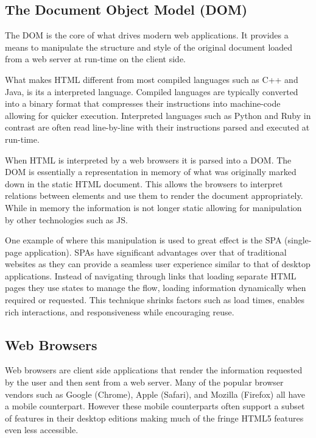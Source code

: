 \documentclass[final]{cmpreport}
\begin{document}

\subsection{The Document Object Model (DOM)}
The DOM is the core of what drives modern web applications. It provides a means to manipulate the structure and style of the original document loaded from a web server at run-time on the client side.

What makes HTML different from most compiled languages such as C++ and Java, is its a interpreted language. Compiled languages are typically converted into a binary format that compresses their instructions into machine-code allowing for quicker execution. Interpreted languages such as Python and Ruby in contrast are often read line-by-line with their instructions parsed and executed at run-time.

When HTML is interpreted by a web browsers it is parsed into a DOM. The DOM is essentially a representation in memory of what was originally marked down in the static HTML document. This allows the browsers to interpret relations between elements and use them to render the document appropriately. While in memory the information is not longer static allowing for manipulation by other technologies such as JS.

One example of where this manipulation is used to great effect is the SPA (single-page application). SPAs have significant advantages over that of traditional websites as they can provide a seamless user experience similar to that of desktop applications. Instead of navigating through links that loading separate HTML pages they use states to manage the flow, loading information dynamically when required or requested. This technique shrinks factors such as load times, enables rich interactions, and responsiveness while encouraging reuse. \citep{Takada}

\subsection{Web Browsers}
Web browsers are client side applications that render the information requested by the user and then sent from a web server. Many of the popular browser vendors such as Google (Chrome), Apple (Safari), and Mozilla (Firefox) all have a mobile counterpart. However these mobile counterparts often support a subset of features in their desktop editions making much of the fringe HTML5 features even less accessible.
\end{document}
